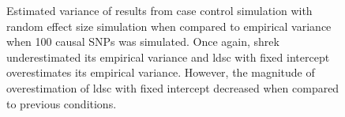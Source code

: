 \begin{figure}
{				
				\label{fig:ldscInCCRandVarCom}
			}
			\caption[Estimation of Variance in Case Control Simulation (100 Causal)]
			{Estimated variance of results from case control simulation with random effect size simulation when compared to empirical variance when 100 causal \glspl{SNP} was simulated.
				Once again, \gls{shrek} underestimated its empirical variance and \gls{ldsc} with fixed intercept overestimates its empirical variance. 
				However, the magnitude of overestimation of \gls{ldsc} with fixed intercept decreased when compared to previous conditions. 
			} 
			\label{fig:CCRandVarCom}
		\end{figure}